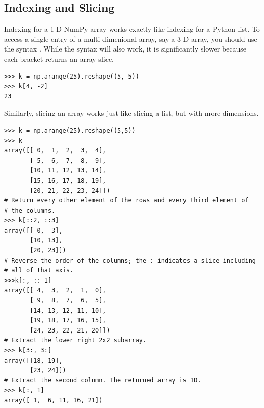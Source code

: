 \subsection*{Indexing and Slicing} 
Indexing for a 1-D NumPy array works exactly like indexing for a Python list. To access a single entry of a multi-dimenional array, say a 3-D array, you should use the syntax . While the syntax  will also work, it is significantly slower because each bracket returns an array slice.
\begin{lstlisting}
>>> k = np.arange(25).reshape((5, 5))
>>> k[4, -2]
23
\end{lstlisting}


Similarly, slicing an array works just like slicing a list, but with more dimensions.

\begin{lstlisting}
>>> k = np.arange(25).reshape((5,5)) 
>>> k
array([[ 0,  1,  2,  3,  4],
       [ 5,  6,  7,  8,  9],
       [10, 11, 12, 13, 14],
       [15, 16, 17, 18, 19],
       [20, 21, 22, 23, 24]])
# Return every other element of the rows and every third element of
# the columns.  
>>> k[::2, ::3] 
array([[ 0,  3],
       [10, 13],
       [20, 23]])
# Reverse the order of the columns; the : indicates a slice including
# all of that axis.
>>>k[:, ::-1] 
array([[ 4,  3,  2,  1,  0],
       [ 9,  8,  7,  6,  5],
       [14, 13, 12, 11, 10],
       [19, 18, 17, 16, 15],
       [24, 23, 22, 21, 20]])
# Extract the lower right 2x2 subarray.
>>> k[3:, 3:] 
array([[18, 19],
       [23, 24]])
# Extract the second column. The returned array is 1D.
>>> k[:, 1] 
array([ 1,  6, 11, 16, 21]) 
\end{lstlisting}

